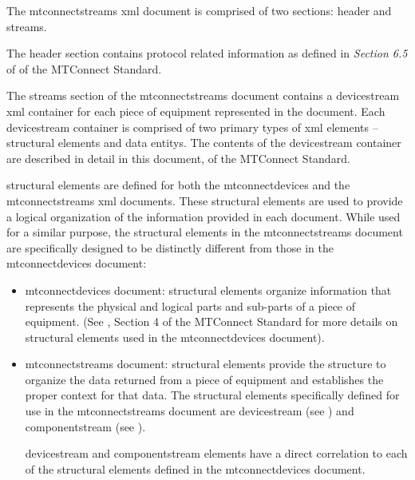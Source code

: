 The \gls{mtconnectstreams} \gls{xml} document is comprised of two sections: \gls{header} and \gls{streams}.

The \gls{header} section contains protocol related information as defined in \textit{Section 6.5} of  of the MTConnect Standard.

The \gls{streams} section of the \gls{mtconnectstreams} document contains a \linebreak\gls{devicestream} \gls{xml} container for each piece of equipment represented in the document.  Each \gls{devicestream} container is comprised of two primary types of \gls{xml} elements – \glspl{structural element} and \glspl{data entity}.  The contents of the \gls{devicestream} container are described in detail in this document,  of the MTConnect Standard.

\glspl{structural element} are defined for both the \gls{mtconnectdevices} and the \gls{mtconnectstreams} \gls{xml} documents.  These \glspl{structural element} are used to provide a logical organization of the information provided in each document.  While used for a similar purpose, the \glspl{structural element} in the \gls{mtconnectstreams} document are specifically designed to be distinctly different from those in the \gls{mtconnectdevices} document:  

\begin{itemize}

\item \gls{mtconnectdevices} document: \glspl{structural element} organize information that represents the physical and logical parts and sub-parts of a piece of equipment.  (See , Section 4 of the MTConnect Standard for more details on \glspl{structural element} used in the \gls{mtconnectdevices} document).  

\item \gls{mtconnectstreams} document: \glspl{structural element} provide the structure to organize the data returned from a piece of equipment and establishes the proper context for that data.  The \glspl{structural element} specifically defined for use in the \gls{mtconnectstreams} document are \gls{devicestream} (see ) and \gls{componentstream} (see ).   

\gls{devicestream} and \gls{componentstream} elements have a direct correlation to each of the \glspl{structural element} defined in the \gls{mtconnectdevices} document.
\end{itemize}

